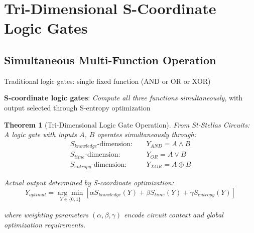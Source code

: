 \documentclass[11pt,a4paper]{article}
\newtheorem{theorem}{Theorem}[section]
\begin{document}
\section{Tri-Dimensional S-Coordinate Logic Gates}

\subsection{Simultaneous Multi-Function Operation}

Traditional logic gates: single fixed function (AND or OR or XOR)

\textbf{S-coordinate logic gates}: \textit{Compute all three functions simultaneously}, with output selected through S-entropy optimization

\begin{theorem}[Tri-Dimensional Logic Gate Operation]
From St-Stellas Circuits\cite{stellas_circuits}: A logic gate with inputs $A$, $B$ operates simultaneously through:
\begin{align}
S_{knowledge}\text{-dimension}: \quad &Y_{AND} = A \land B \\
S_{time}\text{-dimension}: \quad &Y_{OR} = A \lor B \\
S_{entropy}\text{-dimension}: \quad &Y_{XOR} = A \oplus B
\end{align}

Actual output determined by S-coordinate optimization:
\begin{equation}
Y_{optimal} = \underset{Y \in \{0,1\}}{\arg\min} \left[ \alpha S_{knowledge}(Y) + \beta S_{time}(Y) + \gamma S_{entropy}(Y) \right]
\end{equation}

where weighting parameters $(\alpha, \beta, \gamma)$ encode circuit context and global optimization requirements.
\end{theorem}
\end{document}

